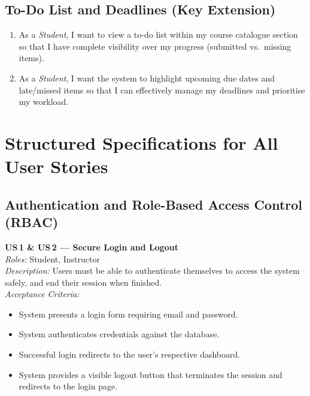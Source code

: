 \documentclass[11pt, legalpaper]{article}
\begin{document}
\subsection{To-Do List and Deadlines \texorpdfstring{\normalfont\small(Key Extension)}{}}
\begin{enumerate}[label=\textbf{US\,\arabic*}, start=23]
  \item As a \emph{Student}, I want to view a to-do list within my course
        catalogue section so that I have complete visibility over my progress
        (submitted vs.\ missing items).
  \item As a \emph{Student}, I want the system to highlight upcoming due dates
        and late/missed items so that I can effectively manage my deadlines and
        prioritise my workload.
\end{enumerate}

\section{Structured Specifications for All User Stories}
\label{sec:specs}

\subsection{Authentication and Role-Based Access Control (RBAC)}

\begin{userstory}
  \textbf{US\,1 \& US\,2 — Secure Login and Logout}\\[4pt]
  \textit{Roles:} Student, Instructor\\[2pt]
  \textit{Description:} Users must be able to authenticate themselves to
  access the system safely, and end their session when finished.\\[4pt]
  \textit{Acceptance Criteria:}
  \begin{itemize}
    \item System presents a login form requiring email and password.
    \item System authenticates credentials against the database.
    \item Successful login redirects to the user's respective dashboard.
    \item System provides a visible logout button that terminates the session
          and redirects to the login page.
  \end{itemize}
\end{userstory}
\end{document}
